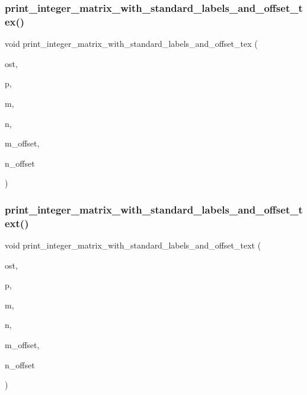 \subsubsection{\texorpdfstring{print\+\_\+integer\+\_\+matrix\+\_\+with\+\_\+standard\+\_\+labels\+\_\+and\+\_\+offset\+\_\+tex()}{print\_integer\_matrix\_with\_standard\_labels\_and\_offset\_tex()}}
{\footnotesize\ttfamily void print\+\_\+integer\+\_\+matrix\+\_\+with\+\_\+standard\+\_\+labels\+\_\+and\+\_\+offset\+\_\+tex (\begin{DoxyParamCaption}\item[{ostream \&}]{ost,  }\item[{\mbox{\hyperlink{galois_8h_a09fddde158a3a20bd2dcadb609de11dc}{I\+NT}} $\ast$}]{p,  }\item[{\mbox{\hyperlink{galois_8h_a09fddde158a3a20bd2dcadb609de11dc}{I\+NT}}}]{m,  }\item[{\mbox{\hyperlink{galois_8h_a09fddde158a3a20bd2dcadb609de11dc}{I\+NT}}}]{n,  }\item[{\mbox{\hyperlink{galois_8h_a09fddde158a3a20bd2dcadb609de11dc}{I\+NT}}}]{m\+\_\+offset,  }\item[{\mbox{\hyperlink{galois_8h_a09fddde158a3a20bd2dcadb609de11dc}{I\+NT}}}]{n\+\_\+offset }\end{DoxyParamCaption})}

\mbox{\label{util_8_c_a8855b188540a9fae4e1d7ea9ac26df43}} 
\subsubsection{\texorpdfstring{print\+\_\+integer\+\_\+matrix\+\_\+with\+\_\+standard\+\_\+labels\+\_\+and\+\_\+offset\+\_\+text()}{print\_integer\_matrix\_with\_standard\_labels\_and\_offset\_text()}}
{\footnotesize\ttfamily void print\+\_\+integer\+\_\+matrix\+\_\+with\+\_\+standard\+\_\+labels\+\_\+and\+\_\+offset\+\_\+text (\begin{DoxyParamCaption}\item[{ostream \&}]{ost,  }\item[{\mbox{\hyperlink{galois_8h_a09fddde158a3a20bd2dcadb609de11dc}{I\+NT}} $\ast$}]{p,  }\item[{\mbox{\hyperlink{galois_8h_a09fddde158a3a20bd2dcadb609de11dc}{I\+NT}}}]{m,  }\item[{\mbox{\hyperlink{galois_8h_a09fddde158a3a20bd2dcadb609de11dc}{I\+NT}}}]{n,  }\item[{\mbox{\hyperlink{galois_8h_a09fddde158a3a20bd2dcadb609de11dc}{I\+NT}}}]{m\+\_\+offset,  }\item[{\mbox{\hyperlink{galois_8h_a09fddde158a3a20bd2dcadb609de11dc}{I\+NT}}}]{n\+\_\+offset }\end{DoxyParamCaption})}

